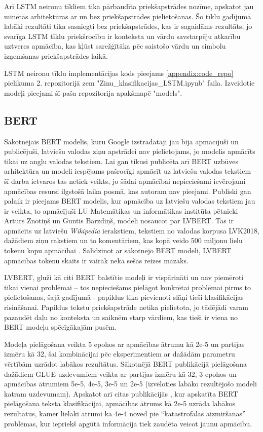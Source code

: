 Arī LSTM neironu tīkliem tika pārbaudīta priekšapstrādes nozīme, apskatot jau minētās arhitektūras ar un bez priekšapstrādes pielietošanas. Šo tīklu gadījumā labāki rezultāti tika sasniegti bez priekšapstrādes, kas ir sagaidāms rezultāts, jo svarīga LSTM tīklu priekšrocību ir konteksta un vārdu savstarpēju atkarību uztveres apmācība, kas kļūst sarežģītāka pēc saistošo vārdu un simbolu izņemšanas priekšapstrādes laikā.

LSTM neironu tīklu implementācijas kods pieejams \ref{appendix:code_repo} pielikuma 2. repozitorijā zem "Zinu\_klasifikacijas\_LSTM.ipynb" faila. Izveidotie modeļi pieejami šī paša repozitorija apakšmapē "models".

\pagebreak


\subsection{BERT}
Sākotnējais BERT modelis, kuru Google izstrādātāji jau bija apmācījuši un publicējuši, latviešu valodas ziņu apstrādei nav pielietojams, jo modelis apmācīts tikai uz angļu valodas tekstiem. Lai gan tikusi publicēta arī BERT uzbūves arhitektūra un modeli iespējams pašrocīgi apmācīt uz latviešu valodas tekstiem – šī darba ietvaros tas netiek veikts, jo šādai apmācībai nepieciešami ievērojami apmācības resursi ilgstošā laika posmā, kas autoram nav pieejami. Publiski gan palaik ir pieejams BERT modelis, kur apmācība uz latviešu valodas tekstiem jau ir veikta, to apmācījuši LU Matemātikas un informātikas institūta pētnieki Artūrs Znotiņš un Guntis Barzdiņš, modeli nosaucot par LVBERT. Tas ir apmācīts uz latviešu \textit{Wikipedia} ierakstiem, tekstiem no valodas korpusa LVK2018, dažādiem ziņu rakstiem un to komentāriem, kas kopā veido 500 miljonu lielu tokenu kopu apmācībai \cite{lvbert}. Salīdzinot ar sākotnējo BERT modeli, LVBERT apmācības tokenu skaits ir vairāk nekā sešas reizes mazāks.

LVBERT, gluži kā citi BERT balstītie modeļi ir vispārināti un nav piemēroti tikai vienai problēmai – tos nepieciešams pielāgot konkrētai problēmai pirms to pielietošanas, šajā gadījumā - papildus tika pievienoti slāņi tieši klasifikācijas risināšanai. Papildus tekstu priekšapstrāde netika pielietota, jo tādējādi varam pazaudēt daļu no konteksta un saiknēm starp vārdiem, kas tieši ir viena no BERT modeļu spēcīgākajām pusēm.

Modeļa pielāgošana veikta 5 epohos ar apmācības ātrumu kā 2e-5 un partijas izmēru kā 32, šai kombinācijai pēc eksperimentiem ar dažādām parametru vērtībām uzrādot labākos rezultātus. Sākotnējā BERT publikācijā \cite{devlin2019bert} pielāgošana dažādiem GLUE uzdevumiem veikta ar partijas izmēru kā 32, 3 epohos un apmācības ātrumiem 5e-5, 4e-5, 3e-5 un 2e-5 (izvēloties labāko rezultējošo modeli katram uzdevumam).  Apskatot arī citas publikācijās \cite{sun2020finetune}, kur apskatīta BERT pielāgošana teksta klasifikācijai, apmācības ātrums kā 2e-5 uzrāda labākos rezultātus, kamēr lielāki ātrumi kā 4e-4 noved pie “katastrofālas aizmiršanas” problēmas, kur iepriekš apgūtā informācija tiek zaudēta veicot jaunu apmācību.


